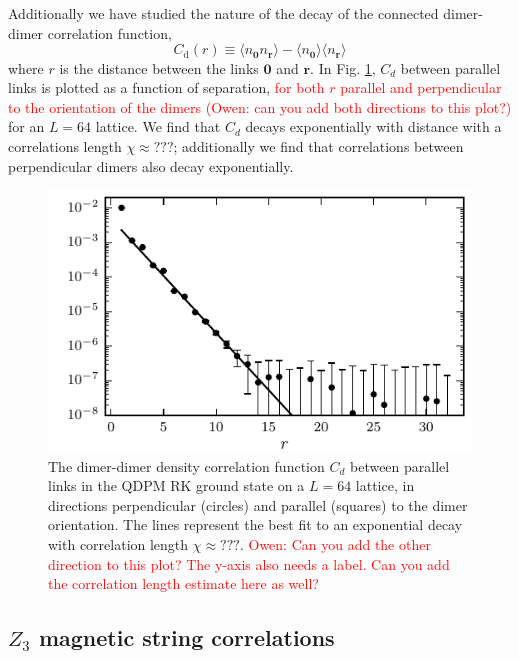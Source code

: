 \documentclass[twocolumn,prb,aps,floatfix,superscriptaddress]{revtex4-1}
\newcommand{\figref}[1]{Fig. \ref{#1}}
\newcommand{\note}[1]{\textcolor{red}{#1}}
\begin{document}
Additionally we have studied the nature of the decay of the connected dimer-dimer correlation function,
  \begin{equation}
    C_{\mathrm{d}} \left(r\right) \equiv \langle n_{\bm{0}} n_{\bm{r}} \rangle - \langle n_{\bm{0}} \rangle   \langle n_{\bm{r}} \rangle   
\end{equation}
where $r$ is the distance between the links $\bm{0}$ and $\bm{r}$. In \figref{fig:spatial_dmr_cor}, $C_d$ between parallel links is plotted as a function of separation, \textcolor{red}{for both $r$ parallel and perpendicular to the orientation of the dimers} \note{(Owen: can you add both directions to this plot?)} for an $L=64$ lattice. We find that $C_d$ decays exponentially with distance with a correlations length  $\chi\approx???$; additionally we find that correlations between perpendicular dimers also decay exponentially.

\begin{figure}
    \centering
    \includegraphics[width=1.0\columnwidth]{spatial_cors_parallel.pdf}
    \caption{The dimer-dimer density correlation function $C_d$ between parallel links in the QDPM RK ground state on a $L=64$ lattice, in directions perpendicular (circles) and parallel (squares) to the dimer orientation.  The lines represent the best fit to an exponential decay with correlation length $\chi\approx???$. \note{Owen: Can you add the other direction to this plot? The y-axis also needs a label. Can you add the correlation length estimate here as well?}}
    \label{fig:spatial_dmr_cor}
\end{figure}

\subsection{$Z_3$ magnetic string correlations}
\end{document}
